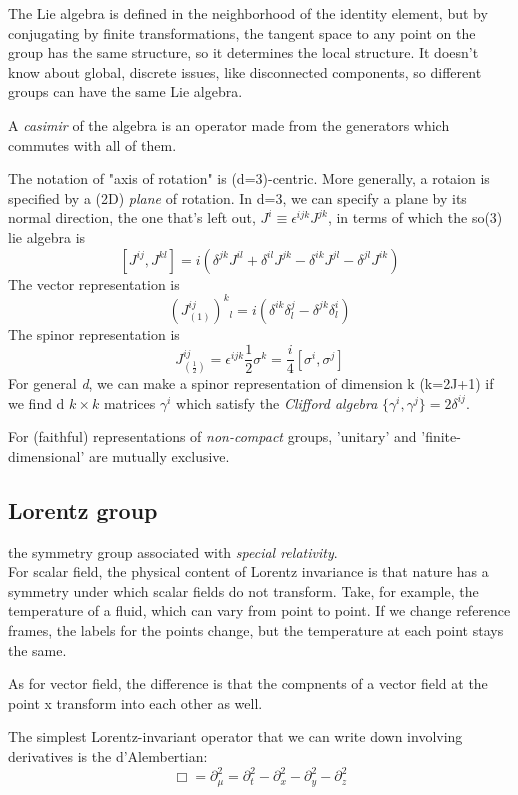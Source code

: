  The Lie algebra is defined in the neighborhood of the identity element, but
 by conjugating by finite transformations, the tangent space to any point on
 the group has the same structure, so it determines the local structure. 
 It doesn't know about global, discrete issues, like disconnected components, 
 so different groups can have the same Lie algebra.

 A \emph{casimir} of the algebra is an operator made from the generators
 which commutes with all of them.

 The notation of "axis of rotation" is (d=3)-centric. More generally, 
 a rotaion is specified by a (2D) \emph{plane} of rotation. 
 In d=3, we can specify a plane by its normal
 direction, the one that's left out, $J^i \equiv \epsilon^{ijk}J^{jk}$, in
 terms of which the so(3) lie algebra is 
 \[
     [J^{ij}, J^{kl}] = i(\delta^{jk}J^{il}+\delta^{il}J^{jk}-\delta^{ik}J^{jl}-\delta^{jl}J^{ik})
     \]
 The vector representation is 
 \[
     \left(J^{ij}_{(1)}\right)^k{}_l = i(\delta^{ik}\delta^j_l - \delta^{jk}\delta^i_l)
     \]
 The spinor representation is 
 \[
     J^{ij}_{(\frac{1}{2})} = \epsilon^{ijk}\frac{1}{2}\sigma^k =
     \frac{i}{4}[\sigma^i, \sigma^j]
     \]
 For general \emph{d}, we can make a spinor representation of dimension k
 (k=2J+1) if we find d $k\times k$ matrices $\gamma^i$ which satisfy the
 \emph{Clifford algebra} $\{\gamma^i, \gamma^j\} = 2\delta^{ij}$.

 For (faithful) representations of \emph{non-compact} groups, 'unitary' and
 'finite-dimensional' are mutually exclusive.
\subsection{Lorentz group} 

the symmetry group associated with \emph{special relativity}. \\

For scalar field, the physical content of Lorentz invariance is 
that nature has a symmetry under which scalar fields do not transform. 
Take, for example, the temperature of a fluid, which can vary from 
point to point. If we change reference frames, the labels for the 
points change, but the temperature at each point stays the same.

As for vector field, the difference is that the compnents of a vector field
at the point x transform into each other as well.

The simplest Lorentz-invariant operator that we can write down involving
derivatives is the d'Alembertian:
\[ \Box = \partial_\mu^2 = \partial^2_t - \partial^2_x - \partial^2_y -
\partial^2_z \]

